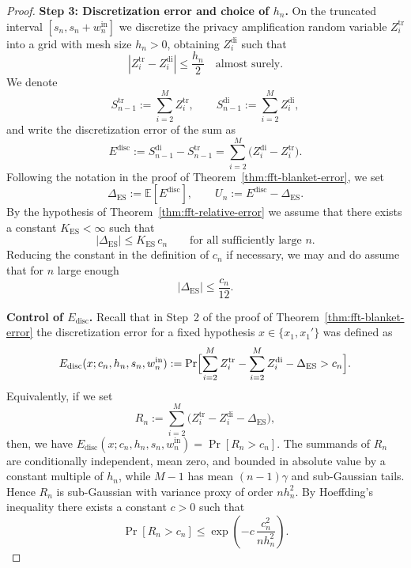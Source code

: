 \documentclass{article}
\theoremstyle{plain}
\theoremstyle{definition}
\begin{document}
\begin{proof}
\textbf{Step 3: Discretization error and choice of $h_n$.}
On the truncated interval $[s_n,s_n+w_n^{\mathrm{in}}]$ we discretize
the privacy amplification random variable
$
  Z_i^{\mathrm{tr}}
$
into a grid with mesh size $h_n>0$, obtaining
$Z_i^{\mathrm{di}}$ such that
\[
  |Z_i^{\mathrm{tr}}-Z_i^{\mathrm{di}}|\le \frac{h_n}{2} \quad \text{almost surely.}
\]
We denote
\[
  S_{n-1}^{\mathrm{tr}} := \sum_{i=2}^M Z_i^{\mathrm{tr}},
  \qquad
  S_{n-1}^{\mathrm{di}} := \sum_{i=2}^M Z_i^{\mathrm{di}},
\]
and write the discretization error of the sum as
\[
  E^{\mathrm{disc}}
  :=
  S_{n-1}^{\mathrm{di}} - S_{n-1}^{\mathrm{tr}}
  =
  \sum_{i=2}^M \bigl(Z_i^{\mathrm{di}} - Z_i^{\mathrm{tr}}\bigr).
\]
Following the notation in the proof of
Theorem~\ref{thm:fft-blanket-error}, we set
\[
  \Delta_{\mathrm{ES}}
  :=
  \mathbb E[E^{\mathrm{disc}}],
  \qquad
  U_n := E^{\mathrm{disc}} - \Delta_{\mathrm{ES}}.
\]
By the hypothesis of Theorem~\ref{thm:fft-relative-error} we assume
that there exists a constant $K_{\mathrm{ES}}<\infty$ such that
\begin{equation}
  \label{eq:DeltaES-assumption}
  |\Delta_{\mathrm{ES}}| \le K_{\mathrm{ES}}\,c_n
  \qquad\text{for all sufficiently large }n.
\end{equation}
Reducing the constant in the definition of $c_n$ if necessary, we may
and do assume that for $n$ large enough
\begin{equation}
  \label{eq:DeltaES-small}
  |\Delta_{\mathrm{ES}}| \le \frac{c_n}{12}.
\end{equation}

\medskip

\textbf{Control of $E_{\mathrm{disc}}$.}
Recall that in Step~2 of the proof of
Theorem~\ref{thm:fft-blanket-error} the discretization error for a
fixed hypothesis $x\in\{x_1,x_1'\}$ was defined as
\[
  E_{\mathrm{disc}}(x;c_n,h_n,s_n,w_n^{\mathrm{in}})
  :=
  \Pr\Bigl[
    \sum_{i=2}^M Z_i^{\mathrm{tr}} - \sum_{i=2}^M Z_i^{\mathrm{di}}
    - \Delta_{\mathrm{ES}} > c_n
  \Bigr].
\]
Equivalently, if we set
\[
  R_n
  :=
  \sum_{i=2}^M
  \bigl(Z_i^{\mathrm{tr}} - Z_i^{\mathrm{di}} - \Delta_{\mathrm{ES}}\bigr),
\]
then, we have $E_{\mathrm{disc}}(x;c_n,h_n,s_n,w_n^{\mathrm{in}})=\Pr[R_n>c_n]$.
The summands of $R_n$ are conditionally independent, mean zero, and
bounded in absolute value by a constant multiple of $h_n$, while
$M-1$ has mean $(n-1)\gamma$ and sub-Gaussian tails.
Hence $R_n$ is sub-Gaussian with variance proxy of order $n h_n^2$.
By Hoeffding's inequality there exists a constant $c>0$ such that
\begin{equation}
  \label{eq:Rn-tail}
  \Pr\left[R_n>c_n\right]
  \le
  \exp\!\left(
    -c\,\frac{c_n^2}{n h_n^2}
  \right).
\end{equation}


\end{proof}
\end{document}
